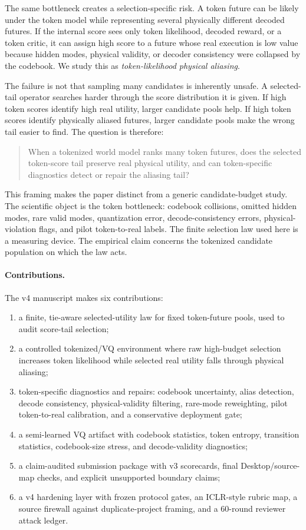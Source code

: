\documentclass{article}
\newcommand{\twma}{token-likelihood physical aliasing}
\begin{document}
The same bottleneck creates a selection-specific risk. A token future can be likely under the token model while representing several physically different decoded futures. If the internal score sees only token likelihood, decoded reward, or a token critic, it can assign high score to a future whose real execution is low value because hidden modes, physical validity, or decoder consistency were collapsed by the codebook. We study this as \emph{\twma{}}.

The failure is not that sampling many candidates is inherently unsafe. A selected-tail operator searches harder through the score distribution it is given. If high token scores identify high real utility, larger candidate pools help. If high token scores identify physically aliased futures, larger candidate pools make the wrong tail easier to find. The question is therefore:
\begin{quote}
When a tokenized world model ranks many token futures, does the selected token-score tail preserve real physical utility, and can token-specific diagnostics detect or repair the aliasing tail?
\end{quote}

This framing makes the paper distinct from a generic candidate-budget study. The scientific object is the token bottleneck: codebook collisions, omitted hidden modes, rare valid modes, quantization error, decode-consistency errors, physical-violation flags, and pilot token-to-real labels. The finite selection law used here is a measuring device. The empirical claim concerns the tokenized candidate population on which the law acts.

\paragraph{Contributions.}
The v4 manuscript makes six contributions:
\begin{enumerate}
\item a finite, tie-aware selected-utility law for fixed token-future pools, used to audit score-tail selection;
\item a controlled tokenized/VQ environment where raw high-budget selection increases token likelihood while selected real utility falls through physical aliasing;
\item token-specific diagnostics and repairs: codebook uncertainty, alias detection, decode consistency, physical-validity filtering, rare-mode reweighting, pilot token-to-real calibration, and a conservative deployment gate;
\item a semi-learned VQ artifact with codebook statistics, token entropy, transition statistics, codebook-size stress, and decode-validity diagnostics;
\item a claim-audited submission package with v3 scorecards, final Desktop/source-map checks, and explicit unsupported boundary claims;
\item a v4 hardening layer with frozen protocol gates, an ICLR-style rubric map, a source firewall against duplicate-project framing, and a 60-round reviewer attack ledger.
\end{enumerate}
\end{document}
